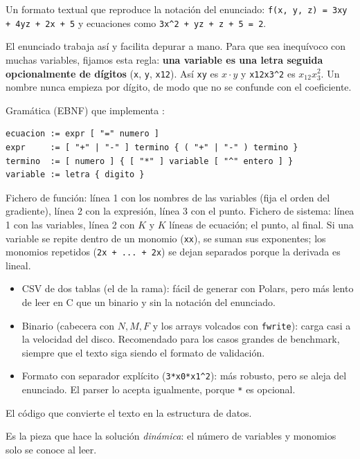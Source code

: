 \que Un formato textual que reproduce la notación del enunciado: \texttt{f(x, y, z) = 3xy + 4yz + 2x + 5} y ecuaciones como \texttt{3x\^{}2 + yz + z + 5 = 2}.

\porque El enunciado trabaja así y facilita depurar a mano. Para que sea inequívoco con muchas variables, fijamos esta regla: \textbf{una variable es una letra seguida opcionalmente de dígitos} (\texttt{x}, \texttt{y}, \texttt{x12}). Así \texttt{xy} es $x\cdot y$ y \texttt{x12x3\^{}2} es $x_{12}x_3^2$. Un nombre nunca empieza por dígito, de modo que no se confunde con el coeficiente.

\como Gramática (EBNF) que implementa :
\begin{lstlisting}
ecuacion := expr [ "=" numero ]
expr     := [ "+" | "-" ] termino { ( "+" | "-" ) termino }
termino  := [ numero ] { [ "*" ] variable [ "^" entero ] }
variable := letra { digito }
\end{lstlisting}
Fichero de función: línea 1 con los nombres de las variables (fija el orden del gradiente), línea 2 con la expresión, línea 3 con el punto. Fichero de sistema: línea 1 con las variables, línea 2 con $K$ y $K$ líneas de ecuación; el punto, al final. Si una variable se repite dentro de un monomio (\texttt{xx}), se suman sus exponentes; los monomios repetidos (\texttt{2x + ... + 2x}) se dejan separados porque la derivada es lineal.

\alt
\begin{itemize}
\item CSV de dos tablas (el  de la rama): fácil de generar con Polars, pero más lento de leer en C que un binario y sin la notación del enunciado.
\item Binario (cabecera con $N,M,F$ y los arrays volcados con \texttt{fwrite}): carga casi a la velocidad del disco. Recomendado para los casos grandes de benchmark, siempre que el texto siga siendo el formato de validación.
\item Formato con separador explícito (\texttt{3*x0*x1\^{}2}): más robusto, pero se aleja del enunciado. El parser lo acepta igualmente, porque \texttt{*} es opcional.
\end{itemize}

\que El código que convierte el texto en la estructura de datos.

\porque Es la pieza que hace la solución \emph{dinámica}: el número de variables y monomios solo se conoce al leer.

